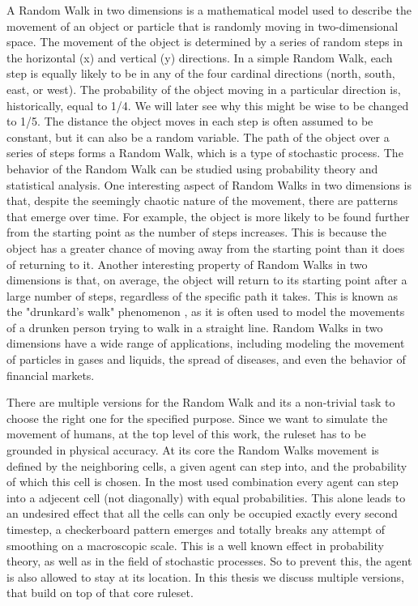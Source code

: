 A Random Walk in two dimensions is a mathematical model used to describe the movement of an object or particle that is randomly moving in two-dimensional space. 
The movement of the object is determined by a series of random steps in the horizontal (x) and vertical (y) directions.
In a simple Random Walk, each step is equally likely to be in any of the four cardinal directions (north, south, east, or west). 
The probability of the object moving in a particular direction is, historically, equal to 1/4. 
We will later see why this might be wise to be changed to 1/5. 
The distance the object moves in each step is often assumed to be constant, 
but it can also be a random variable.
The path of the object over a series of steps forms a Random Walk, which is a type of stochastic process. The behavior of the Random Walk
can be studied using probability theory and statistical analysis. 
One interesting aspect of Random Walks in two dimensions is that, despite the seemingly chaotic nature of the movement, there are patterns that emerge over time. 
For example, the object is more likely to be found further from the starting point as the number of steps increases. 
This is because the object has a greater chance of moving away from the starting point than it does of returning to it.
Another interesting property of Random Walks in two dimensions is that, on average, the object will return to its starting point after a large number of steps, 
regardless of the specific path it takes. This is known as the "drunkard's walk" phenomenon \autocite{ehrhardt2013not}, as it is often used to model the movements of a drunken person trying to walk in a straight line.
Random Walks in two dimensions have a wide range of applications, including modeling the movement of particles in gases and liquids, 
the spread of diseases, and even the behavior of financial markets.

There are multiple versions for the Random Walk and its a non-trivial task to choose the right one for the specified purpose. 
Since we want to simulate the movement of humans, at the top level of this work, the ruleset has to be grounded in physical accuracy. 
At its core the Random Walks movement is defined by the neighboring cells, a given agent can step into, and the probability of which this cell is chosen. 
In the most used combination every agent can step into a adjecent cell (not diagonally) with equal probabilities.
This alone leads to an undesired effect that all the cells can only be occupied exactly every second timestep, a checkerboard pattern 
emerges and totally breaks any attempt of smoothing on a macroscopic scale. 
This is a well known effect in probability theory, as well as in the field of stochastic processes.
So to prevent this, the agent is also allowed to stay at its location. 
In this thesis we discuss multiple versions, that build on top of that core ruleset. 

